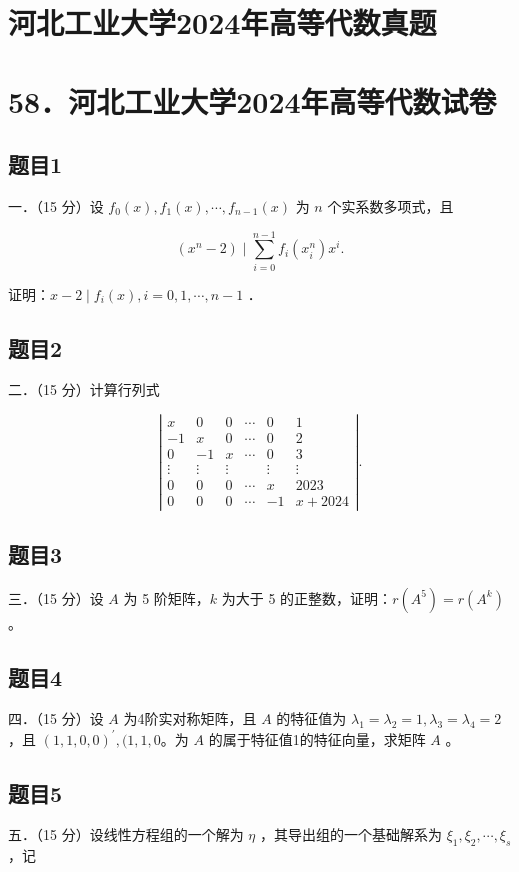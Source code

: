 \documentclass{article}
\begin{document}
\section*{河北工业大学2024年高等代数真题}
\section*{58．河北工业大学2024年高等代数试卷}

\subsection{题目1}
一．（15 分）设 \(f_{0}(x), f_{1}(x), \cdots, f_{n-1}(x)\) 为 \(n\) 个实系数多项式，且

\[
\left(x^{n}-2\right) \mid \sum_{i=0}^{n-1} f_{i}\left(x_{i}^{n}\right) x^{i} .
\]

证明：\(x-2 \mid f_{i}(x), i=0,1, \cdots, n-1\) ．

\subsection{题目2}
二．（15 分）计算行列式

\[
\left|\begin{array}{cccccc}
x & 0 & 0 & \cdots & 0 & 1 \\
-1 & x & 0 & \cdots & 0 & 2 \\
0 & -1 & x & \cdots & 0 & 3 \\
\vdots & \vdots & \vdots & & \vdots & \vdots \\
0 & 0 & 0 & \cdots & x & 2023 \\
0 & 0 & 0 & \cdots & -1 & x+2024
\end{array}\right| .
\]

\subsection{题目3}
三．（15 分）设 \(A\) 为 5 阶矩阵，\(k\) 为大于 5 的正整数，证明：\(r\left(A^{5}\right)=r\left(A^{k}\right)\) 。

\subsection{题目4}
四．（15 分）设 \(A\) 为4阶实对称矩阵，且 \(A\) 的特征值为 \(\lambda_{1}=\lambda_{2}=1, \lambda_{3}=\lambda_{4}=2\) ，且 \((1,1,0,0)^{\prime},(1,1,0\)。为 \(A\) 的属于特征值1的特征向量，求矩阵 \(A\) 。

\subsection{题目5}
五．（15 分）设线性方程组的一个解为 \(\eta\) ，其导出组的一个基础解系为 \(\xi_{1}, \xi_{2}, \cdots, \xi_{s}\) ，记
\end{document}
